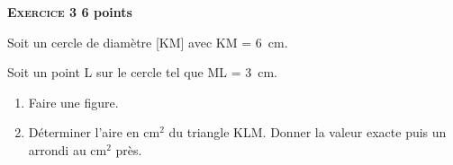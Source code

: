 \textbf{\textsc{Exercice 3} \hfill 6 points}

\medskip

Soit un cercle de diamètre [KM] avec KM = 6~cm.

Soit un point L sur le cercle tel que ML = 3~cm.

\medskip

\begin{enumerate}
\item Faire une figure.
\item Déterminer l'aire en cm$^2$ du triangle KLM. Donner la valeur exacte puis un arrondi au cm$^2$ près.
\end{enumerate}

\vspace{0,5cm}

